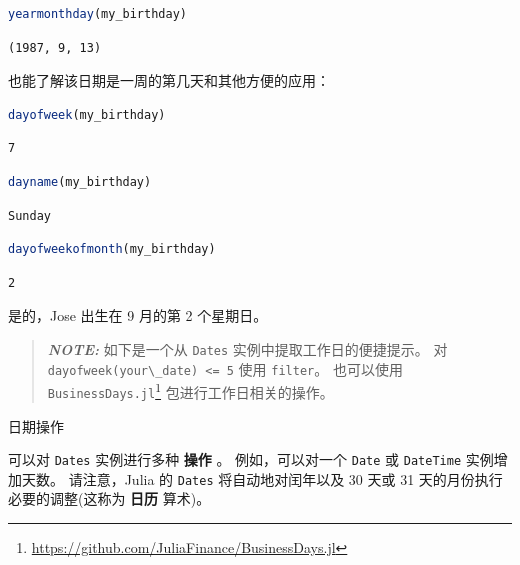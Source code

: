 \documentclass[
  notoc %
]{tufte-book}
\makeatletter
\DeclareRobustCommand{\href}[2]{#2\footnote{\url{#1}}}
\newcommand{\passthrough}[1]{#1}
\renewcommand\subsubsection{%
\@startsection{subsubsection}{3}{\z@ }{-3.25ex\@plus -1ex \@minus -.2ex}{1.5ex \@plus .2ex}{\normalfont \normalsize \bfseries }
}
\makeatother
\begin{document}
\begin{lstlisting}[language=Julia]
yearmonthday(my_birthday)
\end{lstlisting}

\begin{lstlisting}[language=Output]
(1987, 9, 13)
\end{lstlisting}

也能了解该日期是一周的第几天和其他方便的应用：

\begin{lstlisting}[language=Julia]
dayofweek(my_birthday)
\end{lstlisting}

\begin{lstlisting}[language=Output]
7
\end{lstlisting}

\begin{lstlisting}[language=Julia]
dayname(my_birthday)
\end{lstlisting}

\begin{lstlisting}[language=Output]
Sunday
\end{lstlisting}

\begin{lstlisting}[language=Julia]
dayofweekofmonth(my_birthday)
\end{lstlisting}

\begin{lstlisting}[language=Output]
2
\end{lstlisting}

是的，Jose 出生在 9 月的第 2 个星期日。

\begin{quote}
\textbf{\emph{NOTE:}} 如下是一个从 \passthrough{\lstinline!Dates!}
实例中提取工作日的便捷提示。 对
\passthrough{\lstinline!dayofweek(your\_date) <= 5!} 使用
\passthrough{\lstinline!filter!}。 也可以使用
\href{https://github.com/JuliaFinance/BusinessDays.jl}{\passthrough{\lstinline!BusinessDays.jl!}}
包进行工作日相关的操作。
\end{quote}

\hypertarget{sec:dates_operations}{%
\subsubsection{日期操作}\label{sec:dates_operations}}

可以对 \passthrough{\lstinline!Dates!} 实例进行多种 \textbf{操作} 。
例如，可以对一个 \passthrough{\lstinline!Date!} 或
\passthrough{\lstinline!DateTime!} 实例增加天数。 请注意，Julia 的
\passthrough{\lstinline!Dates!} 将自动地对闰年以及 30 天或 31
天的月份执行必要的调整(这称为 \textbf{日历} 算术)。
\end{document}
